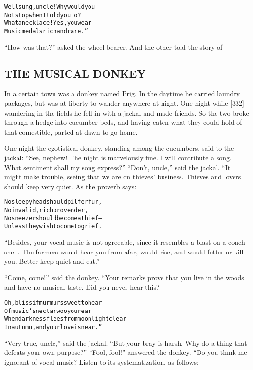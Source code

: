 \documentclass{article}
\renewenvironment{verbatim}{\begin{alltt}\normalfont\begin{centering}}{\end{centering}\end{alltt}}
\begin{document}
\begin{verbatim}
Well sung, uncle! Why would you
Not stop when I told you to?
What a necklace! Yes, you wear
Music medals rich and rare.”
\end{verbatim}
``How was that?'' asked the wheel-bearer. And the other told the
story of

\subsection{THE MUSICAL DONKEY}

In a certain town was a donkey named Prig. In the daytime he
carried laundry packages, but was at liberty to wander anywhere at
night. One night while [332] wandering in the fields he fell in
with a jackal and made friends. So the two broke through a hedge
into cucumber-beds, and having eaten what they could hold of that
comestible, parted at dawn to go home.

One night the egotistical donkey, standing among the cucumbers,
said to the jackal:
``See, nephew! The night is marvelously fine. I will contribute a song. What sentiment shall my song express?''
``Don't, uncle,'' said the jackal. “It might make trouble, seeing
that we are on thieves' business. Thieves and lovers should keep
very quiet. As the proverb says:

\begin{verbatim}
No sleepyhead should pilfer fur,
No invalid, rich provender,
No sneezer should become a thief--
Unless they wish to come to grief.
\end{verbatim}
``Besides, your vocal music is not agreeable, since it resembles a blast on a conch-shell. The farmers would hear you from afar, would rise, and would fetter or kill you. Better keep quiet and eat.''

``Come, come!'' said the donkey. “Your remarks prove that you live
in the woods and have no musical taste. Did you never hear this?

\begin{verbatim}
Oh, bliss if murmurs sweet to hear
Of music's nectar woo your ear
When darkness flees from moonlight clear
In autumn, and your love is near.”
\end{verbatim}
``Very true, uncle,'' said the jackal.
``But your bray is harsh. Why do a thing that defeats your own purpose?''
``Fool, fool!'' answered the donkey. “Do you think me ignorant of
vocal music? Listen to its systematization, as follows:
\end{document}
